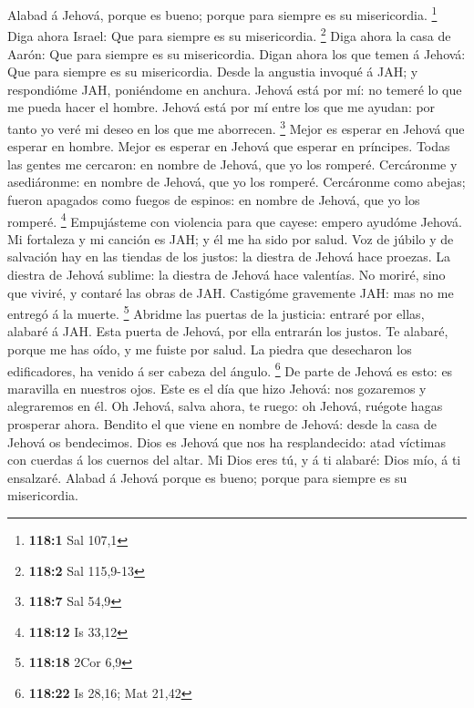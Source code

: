  Alabad á Jehová, porque es bueno; porque para siempre es su
misericordia. \footnote{\textbf{118:1} Sal 107,1}  Diga
ahora Israel: Que para siempre es su misericordia. \footnote{\textbf{118:2}
  Sal 115,9-13}  Diga ahora la casa de Aarón: Que para
siempre es su misericordia.  Digan ahora los que temen á
Jehová: Que para siempre es su misericordia.  Desde la
angustia invoqué á JAH; y respondióme JAH, poniéndome en anchura.
 Jehová está por mí: no temeré lo que me pueda hacer el
hombre.  Jehová está por mí entre los que me ayudan: por
tanto yo veré mi deseo en los que me aborrecen. \footnote{\textbf{118:7}
  Sal 54,9}  Mejor es esperar en Jehová que esperar en
hombre.  Mejor es esperar en Jehová que esperar en
príncipes.  Todas las gentes me cercaron: en nombre de
Jehová, que yo los romperé.  Cercáronme y asediáronme: en
nombre de Jehová, que yo los romperé.  Cercáronme como
abejas; fueron apagados como fuegos de espinos: en nombre de Jehová, que
yo los romperé. \footnote{\textbf{118:12} Is 33,12} 
Empujásteme con violencia para que cayese: empero ayudóme Jehová.
 Mi fortaleza y mi canción es JAH; y él me ha sido por
salud.  Voz de júbilo y de salvación hay en las tiendas de
los justos: la diestra de Jehová hace proezas.  La diestra
de Jehová sublime: la diestra de Jehová hace valentías.  No
moriré, sino que viviré, y contaré las obras de JAH. 
Castigóme gravemente JAH: mas no me entregó á la muerte. \footnote{\textbf{118:18}
  2Cor 6,9}  Abridme las puertas de la justicia: entraré
por ellas, alabaré á JAH.  Esta puerta de Jehová, por ella
entrarán los justos.  Te alabaré, porque me has oído, y me
fuiste por salud.  La piedra que desecharon los
edificadores, ha venido á ser cabeza del ángulo. \footnote{\textbf{118:22}
  Is 28,16; Mat 21,42}  De parte de Jehová es esto: es
maravilla en nuestros ojos.  Este es el día que hizo
Jehová: nos gozaremos y alegraremos en él.  Oh Jehová,
salva ahora, te ruego: oh Jehová, ruégote hagas prosperar ahora.
 Bendito el que viene en nombre de Jehová: desde la casa de
Jehová os bendecimos.  Dios es Jehová que nos ha
resplandecido: atad víctimas con cuerdas á los cuernos del altar.
 Mi Dios eres tú, y á ti alabaré: Dios mío, á ti ensalzaré.
 Alabad á Jehová porque es bueno; porque para siempre es su
misericordia.

